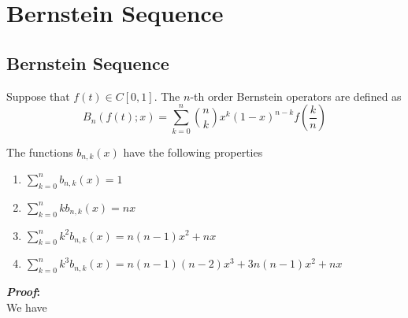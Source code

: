 \chapter{Bernstein Sequence}


\section{Bernstein Sequence}

\begin{definition}
	Suppose that \(f(t) \in C[0,1]\). The $n$-th order Bernstein operators are defined as
	\[
	B_n(f(t);x) = \sum_{k=0}^{n} \binom{n}{k} x^k (1-x)^{n-k} f\left(\frac{k}{n}\right) 
	\]
\end{definition}

\begin{theorem}
	The functions \(b_{n,k}(x)\) have the following properties
	\begin{enumerate}[label=\textbf{\arabic*.}]
		\item \(\sum_{k=0}^{n} b_{n,k}(x) = 1\)
		\item \(\sum_{k=0}^{n} kb_{n,k}(x) = nx\)
		\item \(\sum_{k=0}^{n} k^2 b_{n,k}(x) = n(n-1)x^2 + nx\)
		\item \(\sum_{k=0}^{n} k^3 b_{n,k}(x) = n(n-1)(n-2)x^3 + 3n(n-1)x^2 + nx\)
	\end{enumerate}
\end{theorem}
\noindent
\textbf{\textit{Proof}:}\\
\noindent
We have
